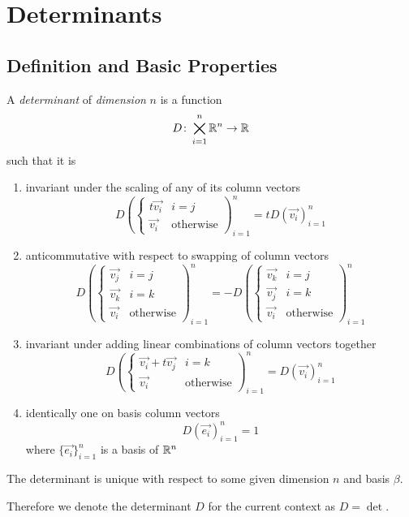 \documentclass[notes.tex]{subfiles}
\begin{document}
\setcounter{section}{4}
\section{Determinants}

\subsection{Definition and Basic Properties}
\begin{definition}[Determinant]
    A \textit{determinant} of \textit{dimension} $n$ is a function
    \[
        D\colon \bigtimes_{i = 1}^n \mathbb{R}^n \to \mathbb{R}
    \]
    such that it is
    \begin{enumerate}[label = (\arabic*)]
        \item invariant under the scaling of any of its column vectors
        \[
            D\left(\begin{cases} 
                t\vec{v_i} & i = j \\
                \vec{v_i} & \text{otherwise}
            \end{cases}
            \right)_{i = 1}^n = tD(\vec{v_i})_{i = 1}^n
        \]
        \item anticommutative with respect to swapping of column vectors
        \[
            D\left(\begin{cases}
                \vec{v_j} & i = j \\
                \vec{v_k} & i = k \\
                \vec{v_i} & \text{otherwise}
            \end{cases}\right)_{i = 1}^n
            =
            -D\left(\begin{cases}
                \vec{v_k} & i = j \\
                \vec{v_j} & i = k \\
                \vec{v_i} & \text{otherwise}
            \end{cases}\right)_{i = 1}^n
        \]
        \item invariant under adding linear combinations of column vectors together
        \[
            D\left(\begin{cases}
                \vec{v_i} + t\vec{v_j} & i = k \\
                \vec{v_i} & \text{otherwise}
            \end{cases}\right)_{i = 1}^n = D(\vec{v_i})_{i = 1}^n
        \]
        \item identically one on basis column vectors
        \[
            D(\vec{e_i})_{i = 1}^n = 1
        \]
        where $\{\vec{e_i}\}_{i = 1}^n$ is a basis of $\mathbb{R}^n$
    \end{enumerate}
    
\end{definition}

\begin{lemma}
    The determinant is unique with respect to some given dimension $n$ and basis $\beta$.
\end{lemma}

Therefore we denote the determinant $D$ for the current context as $D = \det$.
\end{document}
